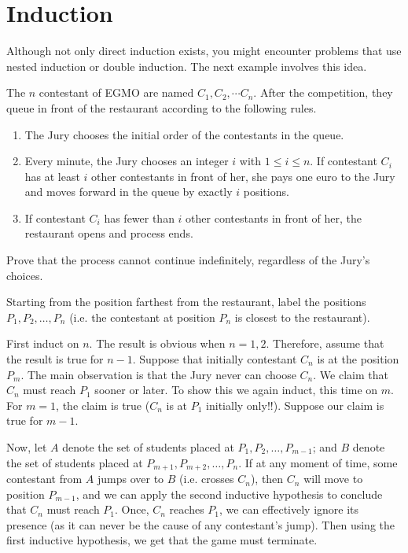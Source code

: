 \section{Induction}

\begin{example}

\end{example}

Although not only direct induction exists, you might encounter problems that use nested induction or double induction. The next example involves this idea.

\begin{example}[EGMO 2018]
    The $n$ contestant of EGMO are named $C_1, C_2, \cdots C_n$. After the competition, they queue in front of the restaurant according to the following rules.
    \begin{enumerate}
        \item The Jury chooses the initial order of the contestants in the queue.
        \item Every minute, the Jury chooses an integer $i$ with $1 \leq i \leq n$.
        If contestant $C_i$ has at least $i$ other contestants in front of her, she pays one euro to the Jury and moves forward in the queue by exactly $i$ positions.
        \item If contestant $C_i$ has fewer than $i$ other contestants in front of her, the restaurant opens and process ends.
    \end{enumerate}
    Prove that the process cannot continue indefinitely, regardless of the Jury’s choices.
\end{example}

\sol Starting from the position farthest from the restaurant, label the positions $P_1,P_2, \dots ,P_n$ (i.e. the contestant at position $P_n$ is closest to the restaurant).

First induct on $n$. The result is obvious when $n=1,2$. Therefore, assume that the result is true for $n-1$. Suppose that initially contestant $C_n$ is at the position $P_m$. The main observation is that the Jury never can choose $C_n$. We claim that $C_n$ must reach $P_1$ sooner or later. To show this we again induct, this time on $m$. For $m=1$, the claim is true ($C_n$ is at $P_1$ initially only!!). Suppose our claim is true for $m-1$.

Now, let $A$ denote the set of students placed at $P_1,P_2, \dots ,P_{m-1}$; and $B$ denote the set of students placed at $P_{m+1},P_{m+2}, \dots ,P_n$. If at any moment of time, some contestant from $A$ jumps over to $B$ (i.e. crosses $C_n$), then $C_n$ will move to position $P_{m-1}$, and we can apply the second inductive hypothesis to conclude that $C_n$ must reach $P_1$. Once, $C_n$ reaches $P_1$, we can effectively ignore its presence (as it can never be the cause of any contestant's jump). Then using the first inductive hypothesis, we get that the game must terminate.

